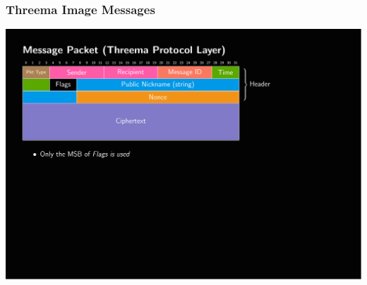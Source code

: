 \documentclass[
	aspectratio=169,
	xetex,
]{beamer}
\begin{document}
\begin{frame}
	\frametitle{Threema Image Messages}
	\includegraphics[page=4,clip,trim={.99cm 7.5cm 3.2cm 1.8cm},width=\textwidth]{out/messages.pdf}
\end{frame}
\end{document}
